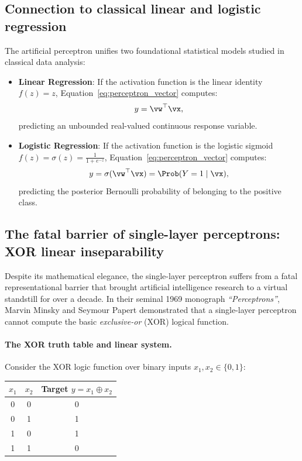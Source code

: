 \documentclass[../../main.tex]{subfiles}
\begin{document}
\subsection{Connection to classical linear and logistic regression}
The artificial perceptron unifies two foundational statistical models studied in classical data analysis:
\begin{itemize}
    \item \textbf{Linear Regression}: If the activation function is the linear identity $f(z) = z$, Equation~\eqref{eq:perceptron_vector} computes:
    \[
    y = \vw^\top \vx,
    \]
    predicting an unbounded real-valued continuous response variable.
    \item \textbf{Logistic Regression}: If the activation function is the logistic sigmoid $f(z) = \sigma(z) = \frac{1}{1 + e^{-z}}$, Equation~\eqref{eq:perceptron_vector} computes:
    \[
    y = \sigma(\vw^\top \vx) = \Prob(Y = 1 \mid \vx),
    \]
    predicting the posterior Bernoulli probability of belonging to the positive class.
\end{itemize}

\subsection{The fatal barrier of single-layer perceptrons: XOR linear inseparability}
\label{subsec:xor_inseparability}

Despite its mathematical elegance, the single-layer perceptron suffers from a fatal representational barrier that brought artificial intelligence research to a virtual standstill for over a decade. In their seminal 1969 monograph \textit{``Perceptrons''}, Marvin Minsky and Seymour Papert demonstrated that a single-layer perceptron cannot compute the basic \emph{exclusive-or} ($\text{XOR}$) logical function.

\paragraph{The XOR truth table and linear system.}
Consider the XOR logic function over binary inputs $x_1, x_2 \in \{0, 1\}$:
\begin{center}
\begin{tabular}{cc|c}
\toprule
$x_1$ & $x_2$ & Target $y = x_1 \oplus x_2$ \\
\midrule
0 & 0 & 0 \\
0 & 1 & 1 \\
1 & 0 & 1 \\
1 & 1 & 0 \\
\bottomrule
\end{tabular}
\end{center}
\end{document}
